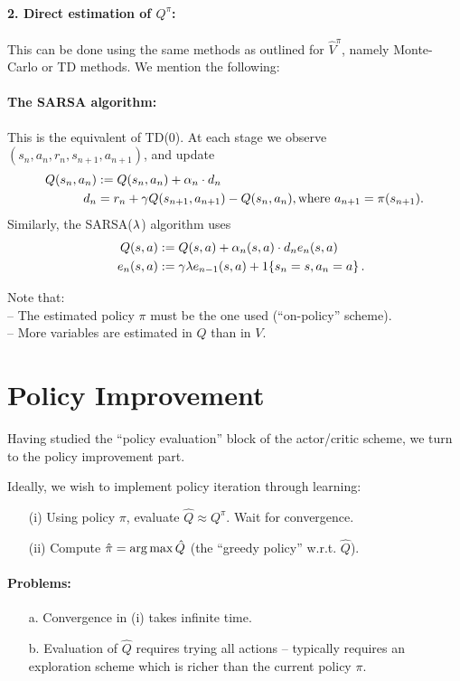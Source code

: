 \paragraph{2. Direct estimation of $Q^{\pi}$:}
This can be done using the same methods as outlined for $\hat V^{\pi}$,
namely Monte-Carlo or TD methods. We mention the following:

\paragraph{The SARSA algorithm:} This is the equivalent of TD(0).
At each stage we observe $(s_n,a_n,r_n,s_{n+1},a_{n+1})$, and update
\begin{align*}
Q(s_n, a_n) & := Q(s_n,a_n) + \alpha_n \cdot d_n \\
d_n & = r_n +  \gamma Q(s_{n+1}, a_{n+1}) - Q(s_n, a_n), \mbox{where } a_{n+1}=\pi(s_{n+1}).
\end{align*}
Similarly, the SARSA($\lambda$) algorithm uses
\begin{align*}
Q(s, a) & := Q(s,a) + \alpha_n(s,a) \cdot d_n e_n(s,a) \\
\quad e_n(s,a)& := \gamma \lambda e_{n-1}(s,a)+1\{s_n=s,a_n=a\} \,.
\end{align*}

Note that:\\
-- The estimated policy $\pi$ must be the one used (``on-policy'' scheme).\\
-- More variables are estimated in $Q$ than in $V$.




\section{Policy Improvement}

Having studied the ``policy evaluation'' block of the actor/critic scheme, we
turn to the policy improvement part.

Ideally, we wish to implement policy iteration through learning:
\begin{itemize} \negspace
\item[(i)]
Using policy $\pi$, evaluate $\hat Q \approx Q^{\pi}$.  Wait for convergence.
\item[(ii)]
Compute $\hat \pi = \argmax \hat Q$ (the ``greedy policy'' w.r.t. $\hat Q$).
\end{itemize}

\paragraph{Problems:}
\begin{itemize}
\item[a.]
Convergence in (i) takes infinite time.
\item[b.]
Evaluation of $\hat Q$ requires trying all actions -- typically requires
an exploration scheme which is richer than the current policy $\pi$.
\end{itemize}

